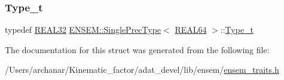 \mbox{\label{structENSEM_1_1SinglePrecType_3_01REAL64_01_4_a931deb5906e330bffb27804fd850d061}} 
\subsubsection{\texorpdfstring{Type\_t}{Type\_t}\hspace{0.1cm}{\footnotesize\ttfamily [2/2]}}
{\footnotesize\ttfamily typedef \mbox{\hyperlink{namespaceENSEM_a7540d01191172323e9073283d772576d}{R\+E\+A\+L32}} \mbox{\hyperlink{structENSEM_1_1SinglePrecType}{E\+N\+S\+E\+M\+::\+Single\+Prec\+Type}}$<$ \mbox{\hyperlink{namespaceENSEM_a85b215b9f1f43715aebee01718e25082}{R\+E\+A\+L64}} $>$\+::\mbox{\hyperlink{structENSEM_1_1SinglePrecType_3_01REAL64_01_4_a931deb5906e330bffb27804fd850d061}{Type\+\_\+t}}}



The documentation for this struct was generated from the following file\+:\begin{DoxyCompactItemize}
\item 
/\+Users/archanar/\+Kinematic\+\_\+factor/adat\+\_\+devel/lib/ensem/\mbox{\hyperlink{lib_2ensem_2ensem__traits_8h}{ensem\+\_\+traits.\+h}}\end{DoxyCompactItemize}
